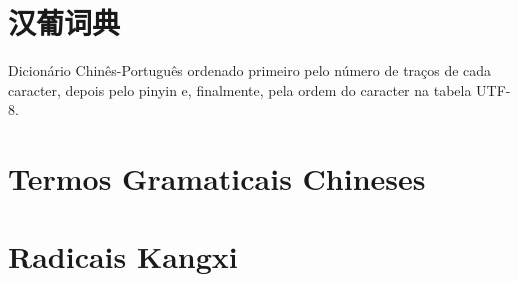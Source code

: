 \documentclass[a4paper,9pt,twoside,openany]{memoir}
\begin{document}



\clearpage
\pagestyle{empty}
\tableofcontents

\clearpage
\pagestyle{empty}
\chapter{汉葡词典}

%
%

Dicionário Chinês-Português ordenado primeiro pelo número de traços
de cada caracter, depois pelo pinyin e, finalmente, pela ordem do
caracter na tabela UTF-8.

\clearpage
\pagestyle{dicionario}
\begin{multicols}{2}






















%
%
%
%
%
\end{multicols}

\clearpage
\pagestyle{plain}
\chapter{Termos Gramaticais Chineses}


\clearpage
\pagestyle{plain}
\chapter{Radicais Kangxi}


\printindex[sradical]
\end{document}
